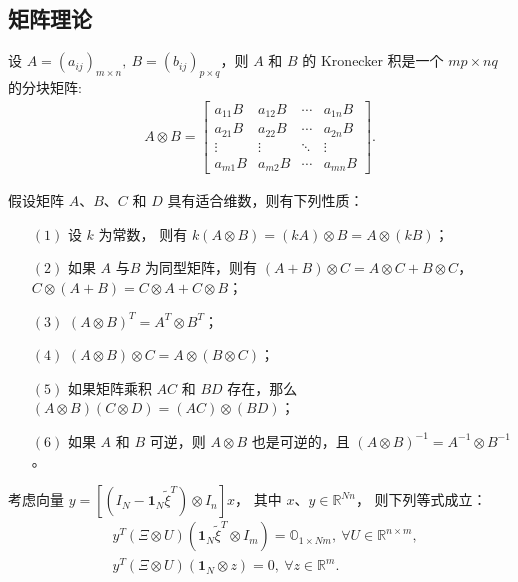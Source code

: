 \subsection{矩阵理论} 
\begin{definition}设 $A=(a_{ij})_{m\times n},\ B=(b_{ij})_{p\times q}$，则 $A$ 和 $B$ 的 Kronecker  积是一个 $mp\times nq$ 的分块矩阵:
    \begin{align*}A\otimes B=
    \left[ \begin{array}{ccccc} 
    a_{11}B &a_{12}B&\cdots& a_{1n}B\\
    a_{21}B &a_{22}B&\cdots&  a_{2n}B\\
    \vdots&\vdots&\ddots&\vdots\\
    a_{m1}B &a_{m2}B&\cdots&  a_{mn}B
    \end{array}\right]. 
    \end{align*}
\end{definition}

\begin{lemma} \cite{horn2012matrix}\label{l1-3-4}
假设矩阵 $A$、$B$、$C$ 和 $D$ 具有适合维数，则有下列性质：
\begin{itemize}
    \item [$(1)$] 设 $k$ 为常数， 则有 $k(A\otimes B)=(kA)\otimes B=A\otimes(kB)$；
    \item [$(2)$] 如果 $A$ 与$B$ 为同型矩阵，则有 $(A+B)\otimes C=A\otimes C+B\otimes C$， $C\otimes (A+B)=C\otimes A+C\otimes B$；
    \item [$(3)$]  $(A\otimes B)^T=A^T\otimes B^T$；
    \item [$(4)$]  $(A\otimes B)\otimes C=A\otimes (B\otimes C)$；
    \item [$(5)$]  如果矩阵乘积 $AC$ 和 $BD$ 存在，那么 $(A \otimes B)(C \otimes D)=(AC) \otimes (BD)$；
    \item [$(6)$]  如果 $A$ 和 $B$ 可逆，则 $A\otimes B$ 也是可逆的，且 $(A\otimes B)^{-1}=A^{-1}\otimes B^{-1}$。 
\end{itemize}
\end{lemma}
\begin{lemma}\cite{gu2019pidDOI}\label{l1-3-5}  考虑向量 $y=[(I_N-\mathbf{1}_{N}\tilde{\xi}^T)\otimes I_n]x$， 其中 $ x$、$y\in\mathbb{R}^{Nn }$， 则下列等式成立：
    \begin{align*}
    &y^T (\Xi\otimes U)(\mathbf{1}_{N}\tilde{\xi}^T \otimes   I_ m)
    = \mathbb{O}_{1\times Nm},\ \forall U\in\mathbb{R}^{n\times  m}, \\
    &y^T (\Xi\otimes  U)(\mathbf{1}_{N}\otimes z)=0,\  \forall z\in\mathbb{R}^{m }.
    \end{align*}
\end{lemma}

